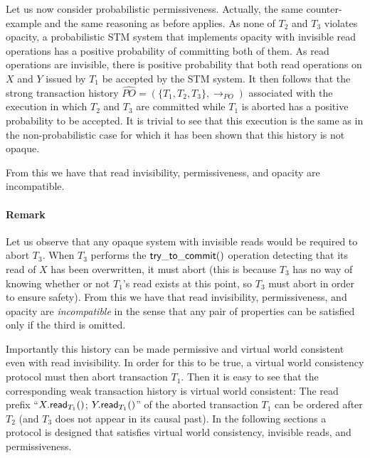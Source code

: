 \begin{proofT}
Let us now consider probabilistic permissiveness. 
Actually,  the  same counter-example and the same reasoning as before
applies. As  none of $T_2$ and $T_3$ violates opacity,
a probabilistic STM system 
that  implements opacity  with invisible  read operations has  a positive
probability of  committing both  of them. As  read operations  are invisible,
there is positive probability that both read operations on $X$ and $Y$ 
issued by $T_1$ be accepted by the STM system. It then follows that the 
strong transaction history  $\widehat{PO}=(\{T_1,T_2,T_3\}, 
\rightarrow_{PO})$  associated  with the  execution in which 
$T_2$  and  $T_3$ are  committed  while $T_1$ is aborted has a positive
probability to be accepted. It is trivial to see that this execution is the 
same as in  the non-probabilistic case for which it has been shown that 
this history is not opaque. %


From this we have that read invisibility, permissiveness, 
and opacity are  incompatible.
\renewcommand{\toto}{proof:opacity-impossibility}
\end{proofT}
\vspace{-0.2cm}   


\paragraph{Remark}
Let us  observe that any opaque system with invisible reads would be
required to abort $T_3$.  When  $T_3$ performs the ${\sf try\_to\_commit}()$ 
operation detecting that its read of $X$  has been overwritten, it must 
abort (this is because  $T_3$ has no way of knowing whether or not
$T_1$'s read exists at this point, so  $T_3$ must abort in order to ensure 
safety).  From this we have that read invisibility, permissiveness, 
and opacity are {\it incompatible} in the sense that any pair of properties 
can be satisfied only if the third is omitted.

Importantly this history can be made permissive and virtual world consistent even with read invisibility.
In order for this to be true, a virtual  world consistency protocol must then
abort transaction $T_1$. 
Then it is easy  to see that the  corresponding weak transaction history 
is virtual world consistent:  
 The  read prefix ``$X.{\sf  read}_{T_1}()$;  $Y.{\sf  read}_{T_1}()$'' 
of the aborted transaction  $T_1$
can be ordered after $T_2$ (and $T_3$ does not appear in its causal past). 
In the following sections a protocol is designed that satisfies virtual world consistency,
invisible reads, and permissiveness.







